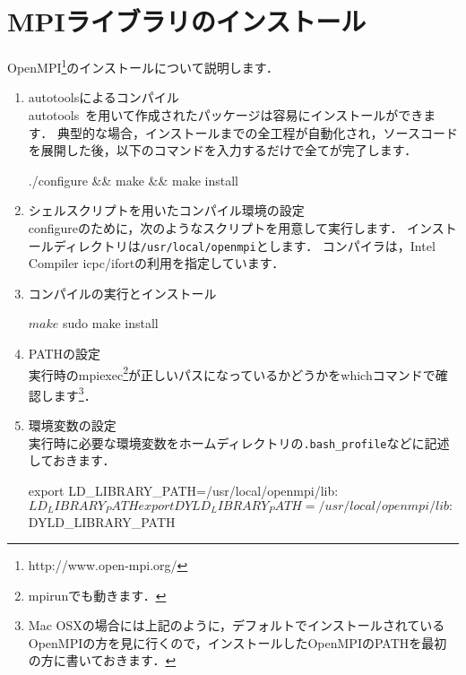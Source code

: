\section{MPIライブラリのインストール}
\label{sec:install MPI}

OpenMPI\footnote{http://www.open-mpi.org/}のインストールについて説明します．

\begin{enumerate}
\item autotoolsによるコンパイル\\
autotools~\cite{autotools}を用いて作成されたパッケージは容易にインストールができます．
典型的な場合，インストールまでの全工程が自動化され，ソースコードを展開した後，以下のコマンドを入力するだけで全てが完了します．
{\small
\begin{program}
./configure && make && make install
\end{program}
}

\item シェルスクリプトを用いたコンパイル環境の設定\\
configureのために，次のようなスクリプトを用意して実行します．
インストールディレクトリは\verb|/usr/local/openmpi|とします．
コンパイラは，Intel Compiler icpc/ifortの利用を指定しています．

{\small
{}
}

\item コンパイルの実行とインストール\\
{\small
\begin{program}
$ make
$ sudo make install
\end{program}
}

\item PATHの設定\\
実行時のmpiexec\footnote{mpirunでも動きます．}が正しいパスになっているかどうかをwhichコマンドで確認します\footnote{Mac OSXの場合には上記のように，デフォルトでインストールされているOpenMPIの方を見に行くので，インストールしたOpenMPIのPATHを最初の方に書いておきます．}．

{\small
{}
}

\item 環境変数の設定\\
実行時に必要な環境変数をホームディレクトリの\verb|.bash_profile|などに記述しておきます．

{\small
\begin{program}
export LD_LIBRARY_PATH=/usr/local/openmpi/lib:$LD_LIBRARY_PATH
export DYLD_LIBRARY_PATH=/usr/local/openmpi/lib:$DYLD_LIBRARY_PATH
\end{program}
}

\end{enumerate}

